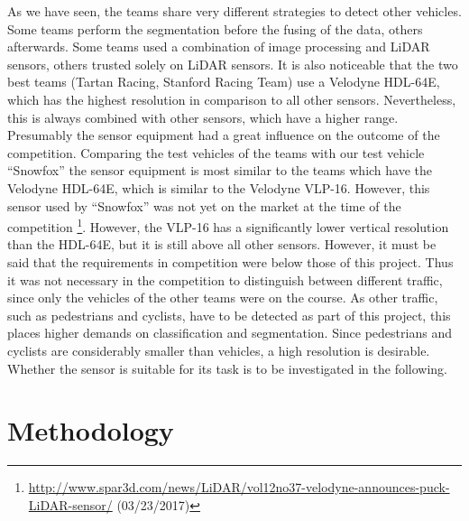 \documentclass[11pt,oneside,openright]{mpreport}
\begin{document}
As we have seen, the teams share very different strategies to detect other vehicles. Some teams perform the segmentation before the fusing of the data, others afterwards.
Some teams used a combination of image processing and LiDAR sensors, others trusted solely on LiDAR sensors. 
It is also noticeable that the two best teams (Tartan Racing, Stanford Racing Team) use a Velodyne HDL-64E,
which has the highest resolution in comparison to all other sensors. Nevertheless, this is always combined with other sensors, which have a higher range. 
Presumably the sensor equipment had a great influence on the outcome of the competition. Comparing the test vehicles of the teams with our test vehicle ``Snowfox'' the sensor equipment
is most similar to the teams which have the Velodyne HDL-64E, which is similar to the Velodyne VLP-16.
However, this sensor used by ``Snowfox'' was not yet on the market at the time of the competition \footnote{\url{http://www.spar3d.com/news/LiDAR/vol12no37-velodyne-announces-puck-LiDAR-sensor/}
(03/23/2017)}. However, the VLP-16 has a significantly lower vertical resolution than the HDL-64E, but it is still above all other sensors.
However, it must be said that the requirements in competition were below those of this project. Thus it was not necessary in the competition to distinguish between 
different traffic, since only the vehicles of the other teams were on the course. As other traffic, such as pedestrians and cyclists, have to be detected as part of this project,
this places higher demands on classification and segmentation. Since pedestrians and cyclists are considerably smaller than vehicles, a high resolution is desirable. 
Whether the sensor is suitable for its task is to be investigated in the following.





\chapter{Methodology}
\end{document}
